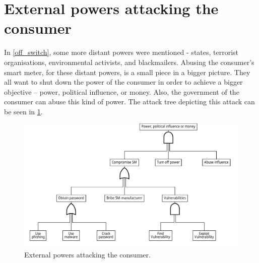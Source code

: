 
\section{External powers attacking the consumer}
In \cref{off_switch}, some more distant powers were mentioned - states, terrorist organisations, environmental activists, and blackmailers.
Abusing the consumer's smart meter, for these distant powers, is a small piece in a bigger picture.
They all want to shut down the power of the consumer in order to achieve a bigger objective -- power, political influence, or money.
Also, the government of the consumer can abuse this kind of power.
The attack tree depicting this attack can be seen in \cref{fig:attack_trees:external}.

\begin{figure}[H]
  \centering
	\includegraphics[width=\textwidth]{figures/graphviz/offswitch.pdf}
	\caption{External powers attacking the consumer.}
	\label{fig:attack_trees:external}
\end{figure}

